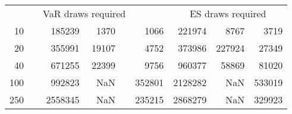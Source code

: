 {\begin{table}[h]
\begin{tabular}{rr rrr r rrr}
\hline 
 && \multicolumn{3}{c}{VaR draws required} &&   \multicolumn{3}{c}{ES draws required} \\  \cline{3-5}  \cline{7-9} 
10 & & 185239 & 1370 & & 1066 & 221974 & 8767 & 3719 \\ 
20 & & 355991 & 19107 & & 4752 & 373986 & 227924 & 27349 \\ 
40 & & 671255 & 22399 & & 9756 & 960377 & 58869 & 81020 \\ 
100 & & 992823 & NaN & & 352801 & 2128282 & NaN & 533019 \\ 
250 & & 2558345 & NaN & & 235215 & 2868279 & NaN & 329923 \\ 
\hline 
\end{tabular} 
\end{table} 
} 
